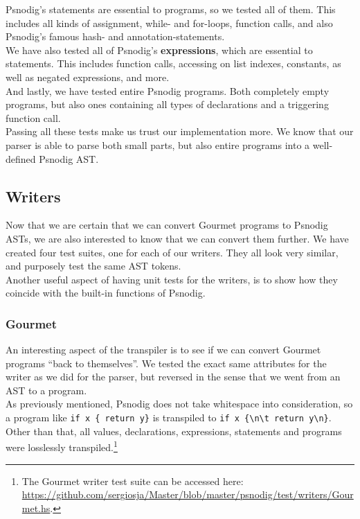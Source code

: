 Psnodig's statements are essential to programs, so we tested all of them. This includes all kinds of assignment, while- and for-loops, function calls, and also Psnodig's famous hash- and annotation-statements. \\

We have also tested all of Psnodig's \textbf{expressions}, which are essential to statements. This includes function calls, accessing on list indexes, constants, as well as negated expressions, and more. \\

And lastly, we have tested entire Psnodig programs. Both completely empty programs, but also ones containing all types of declarations and a triggering function call. \\

Passing all these tests make us trust our implementation more. We know that our parser is able to parse both small parts, but also entire programs into a well-defined Psnodig AST.

\subsection{Writers}

Now that we are certain that we can convert Gourmet programs to Psnodig ASTs, we are also interested to know that we can convert them further. We have created four test suites, one for each of our writers. They all look very similar, and purposely test the same AST tokens. \\

Another useful aspect of having unit tests for the writers, is to show how they coincide with the built-in functions of Psnodig.

\subsubsection{Gourmet}

An interesting aspect of the transpiler is to see if we can convert Gourmet programs ``back to themselves''. We tested the exact same attributes for the writer as we did for the parser, but reversed in the sense that we went from an AST to a program. \\

As previously mentioned, Psnodig does not take whitespace into consideration, so a program like \texttt{if x \{ return y\}} is transpiled to \texttt{if x \{\textbackslash n\textbackslash t return y\textbackslash n\}}. Other than that, all values, declarations, expressions, statements and programs were losslessly transpiled.\footnote{The Gourmet writer test suite can be accessed here: \url{https://github.com/sergiosja/Master/blob/master/psnodig/test/writers/Gourmet.hs}.}

